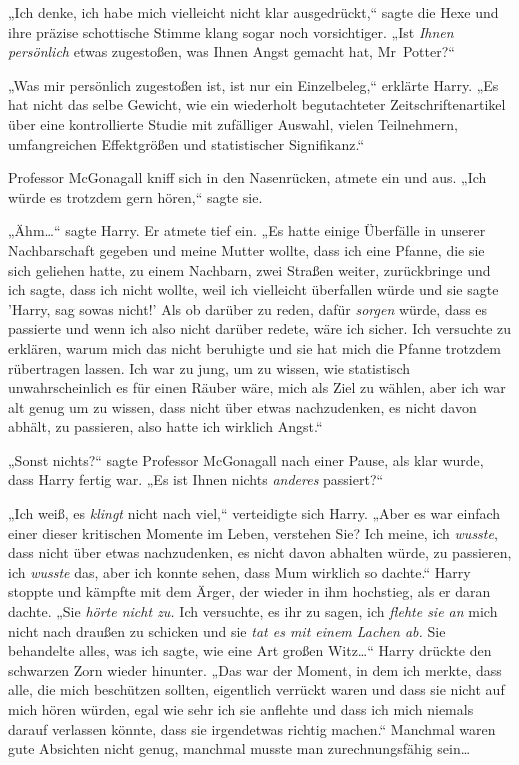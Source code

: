 {„Ich denke, ich habe mich vielleicht nicht klar ausgedrückt,“ sagte die Hexe und ihre präzise schottische Stimme klang sogar noch vorsichtiger. „Ist \emph{Ihnen persönlich} etwas zugestoßen, was Ihnen Angst gemacht hat, Mr~Potter?“

„Was mir persönlich zugestoßen ist, ist nur ein Einzelbeleg,“ erklärte Harry. „Es hat nicht das selbe Gewicht, wie ein wiederholt begutachteter Zeitschriftenartikel über eine kontrollierte Studie mit zufälliger Auswahl, vielen Teilnehmern, umfangreichen Effektgrößen und statistischer Signifikanz.“

Professor McGonagall kniff sich in den Nasenrücken, atmete ein und aus. „Ich würde es trotzdem gern hören,“ sagte sie.

„Ähm…“ sagte Harry. Er atmete tief ein. „Es hatte einige Überfälle in unserer Nachbarschaft gegeben und meine Mutter wollte, dass ich eine Pfanne, die sie sich geliehen hatte, zu einem Nachbarn, zwei Straßen weiter, zurückbringe und ich sagte, dass ich nicht wollte, weil ich vielleicht überfallen würde und sie sagte 'Harry, sag sowas nicht!' Als ob darüber zu reden, dafür \emph{sorgen} würde, dass es passierte und wenn ich also nicht darüber redete, wäre ich sicher. Ich versuchte zu erklären, warum mich das nicht beruhigte und sie hat mich die Pfanne trotzdem rübertragen lassen. Ich war zu jung, um zu wissen, wie statistisch unwahrscheinlich es für einen Räuber wäre, mich als Ziel zu wählen, aber ich war alt genug um zu wissen, dass nicht über etwas nachzudenken, es nicht davon abhält, zu passieren, also hatte ich wirklich Angst.“

„Sonst nichts?“ sagte Professor McGonagall nach einer Pause, als klar wurde, dass Harry fertig war. „Es ist Ihnen nichts \emph{anderes} passiert?“

„Ich weiß, es \emph{klingt} nicht nach viel,“ verteidigte sich Harry. „Aber es war einfach einer dieser kritischen Momente im Leben, verstehen Sie? Ich meine, ich \emph{wusste}, dass nicht über etwas nachzudenken, es nicht davon abhalten würde, zu passieren, ich \emph{wusste} das, aber ich konnte sehen, dass Mum wirklich so dachte.“ Harry stoppte und kämpfte mit dem Ärger, der wieder in ihm hochstieg, als er daran dachte. „Sie \emph{hörte nicht zu.} Ich versuchte, es ihr zu sagen, ich \emph{flehte sie an} mich nicht nach draußen zu schicken und sie \emph{tat es mit einem Lachen ab.} Sie behandelte alles, was ich sagte, wie eine Art großen Witz…“ Harry drückte den schwarzen Zorn wieder hinunter. „Das war der Moment, in dem ich merkte, dass alle, die mich beschützen sollten, eigentlich verrückt waren und dass sie nicht auf mich hören würden, egal wie sehr ich sie anflehte und dass ich mich niemals darauf verlassen könnte, dass sie irgendetwas richtig machen.“ Manchmal waren gute Absichten nicht genug, manchmal musste man zurechnungsfähig sein…

}
